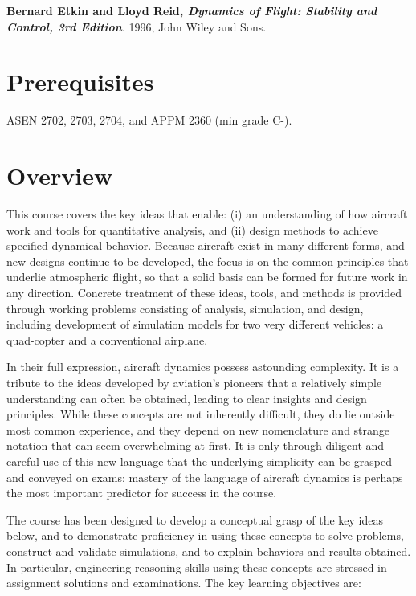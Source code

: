 \documentclass[9pt]{article}
\begin{document}
\textbf{Bernard Etkin and Lloyd Reid, \textit{Dynamics of Flight: Stability and Control, 3rd Edition}}. 1996, John Wiley and Sons.

\section*{Prerequisites}

ASEN 2702, 2703, 2704, and APPM 2360 (min grade C-).

\section*{Overview}

This course covers the key ideas that enable: (i) an understanding of
how aircraft work and tools for quantitative analysis, and (ii) design
methods to achieve specified dynamical behavior. Because aircraft exist
in many different forms, and new designs continue to be developed, the
focus is on the common principles that underlie atmospheric flight, so
that a solid basis can be formed for future work in any direction.
Concrete treatment of these ideas, tools, and methods is provided
through working problems consisting
of analysis, simulation, and design, including development of
simulation models for two very different vehicles: a quad-copter and a
conventional airplane.

In their full expression, aircraft dynamics possess astounding
complexity. It is a tribute to the ideas developed by aviation's
pioneers that a relatively simple understanding can often be obtained,
leading to clear insights and design principles. While these concepts
are not inherently difficult, they do lie outside most common
experience, and they depend on new nomenclature and strange notation
that can seem overwhelming at first. It is only through diligent and
careful use of this new language that the underlying simplicity can be
grasped and conveyed on exams; mastery of the language of aircraft
dynamics is perhaps the most important predictor for success in the
course.

The course has been designed to develop a conceptual grasp of the key
ideas below, and to demonstrate proficiency in using these concepts to
solve problems, construct and validate simulations, and to explain
behaviors and results obtained. In particular, engineering reasoning
skills using these concepts are stressed in assignment solutions and
examinations. The key learning objectives are:\\
\end{document}
